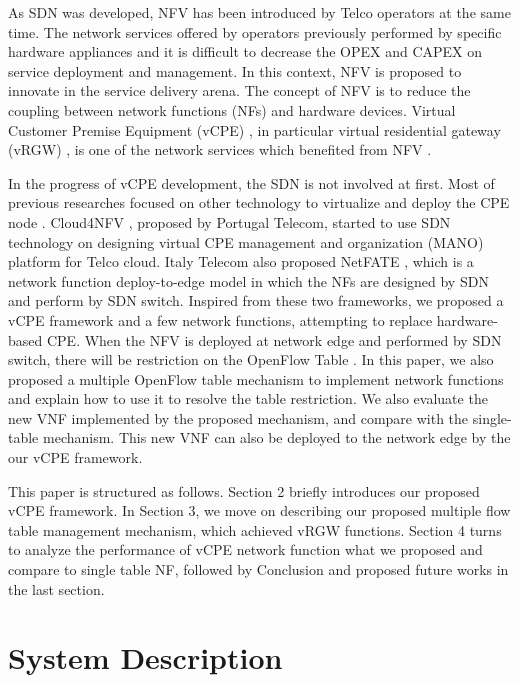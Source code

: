 \documentclass[conference]{IEEEtran}
\begin{document}
As SDN was developed, NFV \cite{nfv-wp, etsi-nfv-archi, nfv-survey} has been introduced by Telco operators at the same time.
The network services offered by operators previously performed by specific hardware appliances and it is difficult to decrease the OPEX and CAPEX on service deployment and management.
In this context, NFV is proposed to innovate in the service delivery arena.
The concept of NFV is to reduce the coupling between network functions (NFs) and hardware devices.
Virtual Customer Premise Equipment (vCPE) \cite{nec-vcpe, vcpe-enhance}, in particular virtual residential gateway (vRGW) \cite{nfv-home}, is one of the network services which benefited from NFV \cite{etsi-nfv-usecase}.

In the progress of vCPE development, the SDN is not involved at first.
Most of previous researches focused on other technology to virtualize and deploy the CPE node \cite{virtual-rg, security-vgw, design-vrgw, nfv-hgw-surrogate, linux-cpe, nfv-resoure-contrain-cpe}.
Cloud4NFV \cite{cloud4nfv, cloud4nfv-telco}, proposed by Portugal Telecom, started to use SDN technology on designing virtual CPE management and organization (MANO) platform for Telco cloud.
Italy Telecom also proposed NetFATE \cite{netfate}, which is a network function deploy-to-edge model in which the NFs are designed by SDN and perform by SDN switch. Inspired from these two frameworks, we proposed a vCPE framework and a few network functions, attempting to replace hardware-based CPE.
When the NFV is deployed at network edge and performed by SDN switch, there will be restriction on the OpenFlow Table \cite{multiple-flow-table}.
In this paper, we also proposed a multiple OpenFlow table mechanism to implement network functions and explain how to use it to resolve the table restriction.
We also evaluate the new VNF implemented by the proposed mechanism, and compare with the single-table mechanism.
This new VNF can also be deployed to the network edge by the our vCPE framework.

This paper is structured as follows. Section 2 briefly introduces our proposed vCPE framework.
In Section 3, we move on describing our proposed multiple flow table management mechanism, which achieved vRGW functions.
Section 4 turns to analyze the performance of vCPE network function what we proposed and compare to single table NF, followed by Conclusion and proposed future works in the last section.

\section{System Description}
\end{document}
